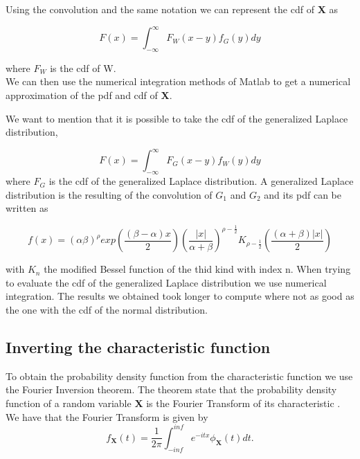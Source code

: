 \documentclass[12pt,travaildirige,nobabel, twoside]{dms}
\numberwithin{equation}{section}
\numberwithin{table}{chapter}
\numberwithin{figure}{chapter}
\begin{document}
Using the convolution and the same notation we can represent the cdf of \textbf{X} as 

\begin{equation}
F(x)=\int_{-\infty}^{\infty}F_W(x-y)f_G(y)dy 
\end{equation}

where $F_W$ is the cdf of W\nocite{rigprob}.\\

We can then use the numerical integration methods of Matlab to get a numerical approximation of the pdf and cdf of \textbf{X}.

We want to mention that it is possible to take the cdf  of the generalized Laplace distribution,

\begin{equation}
F(x)=\int_{-\infty}^{\infty}F_G(x-y)f_W(y)dy 
\end{equation}
where $F_G$ is the cdf of the generalized Laplace distribution. A generalized Laplace distribution is the resulting of the convolution of  \textbf{$G_1$} and \textbf{$G_2$} and its pdf can be written as 

\begin{equation}
f(x)=(\alpha\beta)^\rho exp(\frac{(\beta-\alpha)x}{2})(\frac{|x|}{\alpha+\beta})^{\rho-\frac{1}{2}}{K_{\rho-\frac{1}{2}}}(\frac{(\alpha+\beta)|x|}{2})
\end{equation}

with $K_n$ the modified Bessel function of the thid kind with index n\nocite{appGNL}. When trying to evaluate the cdf of the generalized Laplace distribution we use numerical integration. The results we obtained took longer to compute where not as good as the one with the cdf of the normal distribution.



\subsection{Inverting the characteristic function}

To obtain the probability density function from the characteristic function we use the Fourier Inversion theorem. The theorem state that the probability density function of a random variable \textbf{X} is the Fourier Transform of its characteristic \citep{KnightSticher}. We have that the Fourier Transform is given by 
\begin{equation}
f_\textbf{X}(t)=\frac{1}{2\pi}\int_{-inf}^{inf}e^{-itx}\phi_\textbf{X}(t)dt.
\end{equation} \\
\end{document}
